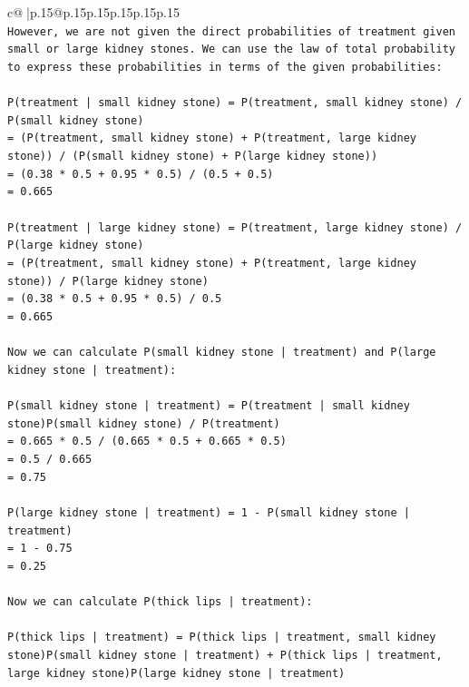 \documentclass{article}
\begin{document}
{\begin{supertabular}{c@{$\;$}|p{.15\linewidth}@{}p{.15\linewidth}p{.15\linewidth}p{.15\linewidth}p{.15\linewidth}p{.15\linewidth}}
{{{\\ 
\texttt{However, we are not given the direct probabilities of treatment given small or large kidney stones. We can use the law of total probability to express these probabilities in terms of the given probabilities:} \\
\\ 
\texttt{P(treatment | small kidney stone) = P(treatment, small kidney stone) / P(small kidney stone)} \\
\texttt{= (P(treatment, small kidney stone) + P(treatment, large kidney stone)) / (P(small kidney stone) + P(large kidney stone))} \\
\texttt{= (0.38 * 0.5 + 0.95 * 0.5) / (0.5 + 0.5)} \\
\texttt{= 0.665} \\
\\ 
\texttt{P(treatment | large kidney stone) = P(treatment, large kidney stone) / P(large kidney stone)} \\
\texttt{= (P(treatment, small kidney stone) + P(treatment, large kidney stone)) / P(large kidney stone)} \\
\texttt{= (0.38 * 0.5 + 0.95 * 0.5) / 0.5} \\
\texttt{= 0.665} \\
\\ 
\texttt{Now we can calculate P(small kidney stone | treatment) and P(large kidney stone | treatment):} \\
\\ 
\texttt{P(small kidney stone | treatment) = P(treatment | small kidney stone)P(small kidney stone) / P(treatment)} \\
\texttt{= 0.665 * 0.5 / (0.665 * 0.5 + 0.665 * 0.5)} \\
\texttt{= 0.5 / 0.665} \\
\texttt{= 0.75} \\
\\ 
\texttt{P(large kidney stone | treatment) = 1 {-} P(small kidney stone | treatment)} \\
\texttt{= 1 {-} 0.75} \\
\texttt{= 0.25} \\
\\ 
\texttt{Now we can calculate P(thick lips | treatment):} \\
\\ 
\texttt{P(thick lips | treatment) = P(thick lips | treatment, small kidney stone)P(small kidney stone | treatment) + P(thick lips | treatment, large kidney stone)P(large kidney stone | treatment)} \\
}}}
\end{supertabular}}
\end{document}
